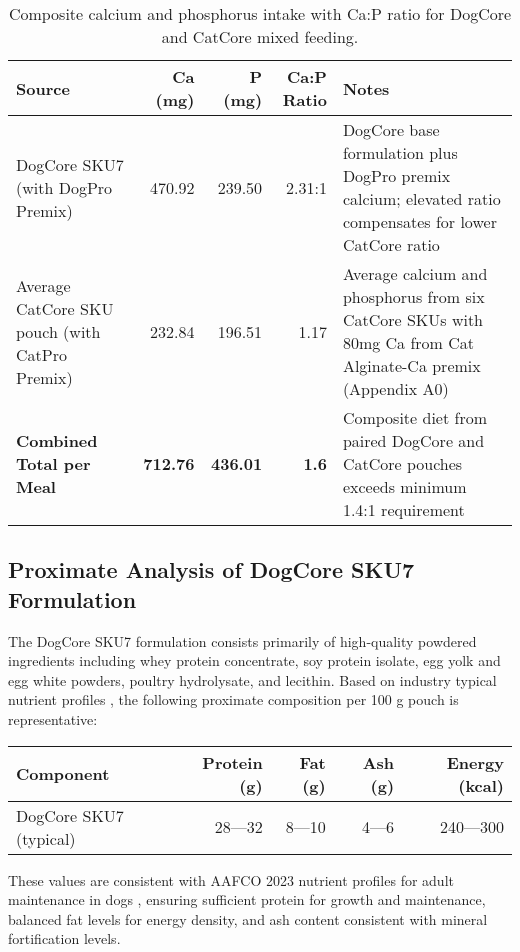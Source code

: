 \begin{table}[htbp]  
\centering  
\begin{tabular}{@{}l r r r p{7.5cm}@{}}  
\toprule  
Source & Ca (mg) & P (mg) & Ca:P Ratio & Notes \\  
\midrule  
DogCore SKU7 (with DogPro Premix) & 470.92 & 239.50 & 2.31:1 & DogCore base formulation plus DogPro premix calcium; elevated ratio compensates for lower CatCore ratio \\  
Average CatCore SKU pouch (with CatPro Premix) & 232.84 & 196.51 & 1.17 & Average calcium and phosphorus from six CatCore SKUs with 80mg Ca from Cat Alginate-Ca premix (Appendix A0) \\  
\midrule  
\textbf{Combined Total per Meal} & \textbf{712.76} & \textbf{436.01} & \textbf{1.6} & Composite diet from paired DogCore and CatCore pouches exceeds minimum 1.4:1 requirement \\  
\bottomrule  
\end{tabular}  
\caption*{Composite calcium and phosphorus intake with Ca:P ratio for DogCore and CatCore mixed feeding.}  
\end{table}  

\subsection*{Proximate Analysis of DogCore SKU7 Formulation}

The DogCore SKU7 formulation consists primarily of high-quality powdered ingredients including whey protein concentrate, soy protein isolate, egg yolk and egg white powders, poultry hydrolysate, and lecithin. Based on industry typical nutrient profiles \cite{USDA_FoodData_Central}, the following proximate composition per 100 g pouch is representative:

\begin{table}[htbp]
\centering
\begin{tabular}{@{}l r r r r@{}}
\toprule
Component & Protein (g) & Fat (g) & Ash (g) & Energy (kcal) \\
\midrule
DogCore SKU7 (typical) & 28---32 & 8---10 & 4---6 & 240---300 \\
\bottomrule
\end{tabular}
\end{table}

These values are consistent with AAFCO 2023 nutrient profiles for adult maintenance in dogs \cite{AAFCO_2023}, ensuring sufficient protein for growth and maintenance, balanced fat levels for energy density, and ash content consistent with mineral fortification levels.

